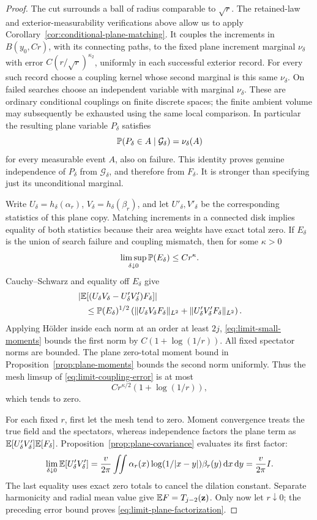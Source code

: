 \begin{proof}
The cut surrounds a ball of radius comparable to \(\sqrt r\).
The retained-law and exterior-measurability verifications above allow
us to apply Corollary~\ref{cor:conditional-plane-matching}.  It couples
the increments
in \(B(y_0,Cr)\), with its connecting paths, to the fixed plane
increment marginal \(\nu_\delta\) with error
\(C(r/\sqrt r)^{\kappa_2}\), uniformly in each successful exterior
record.  For every such record choose a coupling kernel whose
second marginal is this same \(\nu_\delta\).  On failed searches
choose an independent variable with marginal \(\nu_\delta\).
These are ordinary conditional couplings on finite discrete
spaces; the finite ambient volume may subsequently be exhausted
using the same local comparison.  In particular the resulting
plane variable \(P_\delta\) satisfies
\[
     \mathbb P(P_\delta\in A\mid\mathcal G_\delta)=\nu_\delta(A)
\]
for every measurable event \(A\), also on failure.  This identity
proves genuine independence of \(P_\delta\) from
\(\mathcal G_\delta\), and therefore from \(F_\delta\).
It is stronger than specifying just its unconditional marginal.

Write \(U_\delta=h_\delta(\alpha_r)\),
\(V_\delta=h_\delta(\beta_r)\), and let \(U'_\delta,V'_\delta\)
be the corresponding statistics of this plane copy.
Matching increments in a connected disk implies equality of both
statistics because their area weights have exact total zero.
If \(E_\delta\) is the union of search failure and coupling mismatch,
then for some \(\kappa>0\)
\[
 \limsup_{\delta\downarrow0}\mathbb P(E_\delta)\le Cr^\kappa.
\]
Cauchy--Schwarz and equality off \(E_\delta\) give
\begin{align}
 &\left|\mathbb E[(U_\delta V_\delta-U'_\delta V'_\delta)F_\delta]\right|
 \nonumber\\
 &\quad\le
 \mathbb P(E_\delta)^{1/2}
 \left(\|U_\delta V_\delta F_\delta\|_{L^2}
               +\|U'_\delta V'_\delta F_\delta\|_{L^2}\right).
 \label{eq:limit-coupling-error}
\end{align}
Applying H\"older inside each norm at an order at least \(2j\),
\eqref{eq:limit-small-moments} bounds the first norm by
\(C(1+\log(1/r))\).  All fixed spectator norms are bounded.
The plane zero-total moment bound in
Proposition~\ref{prop:plane-moments} bounds the second norm uniformly.
Thus the mesh limsup of \eqref{eq:limit-coupling-error} is at most
\[
                  Cr^{\kappa/2}(1+\log(1/r)),
\]
which tends to zero.

For each fixed \(r\), first let the mesh tend to zero.
Moment convergence treats the true field and the spectators,
whereas independence factors the plane term as
\(\mathbb E[U'_\delta V'_\delta]\mathbb E[F_\delta]\).
Proposition~\ref{prop:plane-covariance} evaluates its first factor:
\[
 \lim_{\delta\downarrow0}\mathbb E[U'_\delta V'_\delta]
   =\frac{v}{2\pi}
       \iint\alpha_r(x)\log(1/|x-y|)\beta_r(y)\,\mathrm d x\,\mathrm d y
   =\frac{v}{2\pi}I.
\]
The last equality uses exact zero totals to cancel the dilation
constant.  Separate harmonicity and radial mean value give
\(\mathbb E F=T_{j-2}(\mathbf z)\).  Only now let \(r\downarrow0\);
the preceding error bound proves \eqref{eq:limit-plane-factorization}.


\end{proof}
